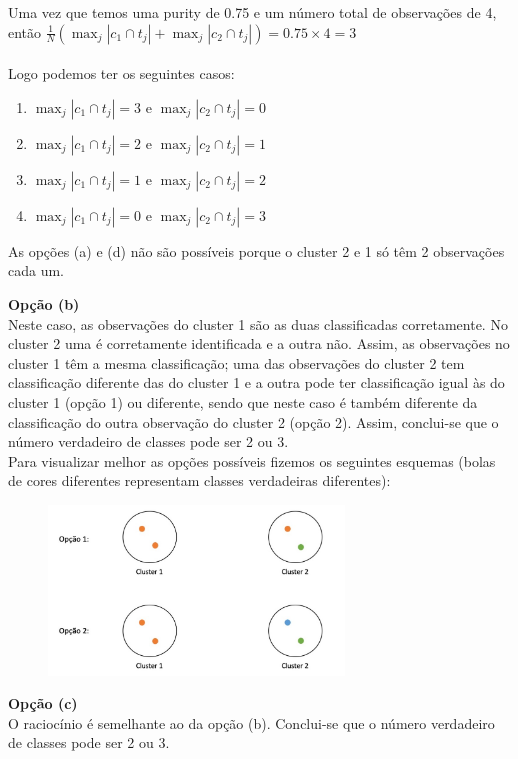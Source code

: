 \documentclass[a4paper,12pt]{article} %
\begin{document}
\begin{enumerate}
Uma vez que temos uma purity de 0.75 e um número total de observações de 4,
então $\frac{1}{N} \left( \max_j |c_1 \cap t_j| + \max_j |c_2 \cap t_j| \right) = 0.75 \times 4 = 3$ \\ \\

Logo podemos ter os seguintes casos:
\begin{enumerate}
    \item $\max_j |c_1 \cap t_j| = 3$ e $\max_j |c_2 \cap t_j| = 0$
    \item $\max_j |c_1 \cap t_j| = 2$ e $\max_j |c_2 \cap t_j| = 1$
    \item $\max_j |c_1 \cap t_j| = 1$ e $\max_j |c_2 \cap t_j| = 2$
    \item $\max_j |c_1 \cap t_j| = 0$ e $\max_j |c_2 \cap t_j| = 3$
\end{enumerate}

As opções (a) e (d) não são possíveis porque o cluster 2 e 1 só têm 2 observações cada um. 

\textbf{Opção (b)} \\ 
Neste caso, as observações do cluster 1 são as duas classificadas corretamente. 
No cluster 2 uma é corretamente identificada e a outra não. Assim, as observações 
no cluster 1 têm a mesma classificação; uma das observações do cluster 2 tem classificação
diferente das do cluster 1 e a outra pode ter classificação igual às do cluster 1 (opção 1)
ou diferente, sendo que neste caso é também diferente da classificação do outra observação
do cluster 2 (opção 2). Assim, conclui-se que o número verdadeiro de classes pode ser 2 ou 3. \\
Para visualizar melhor as opções possíveis fizemos os seguintes esquemas 
(bolas de cores diferentes representam classes verdadeiras diferentes):

\begin{figure}[H]
    \centering
    \includegraphics[width=0.7\textwidth]{ex4_clusters.jpg}
\end{figure}

\textbf{Opção (c)} \\
O raciocínio é semelhante ao da opção (b). Conclui-se que o número verdadeiro de classes pode ser 2 ou 3.

\end{enumerate}
\end{document}
